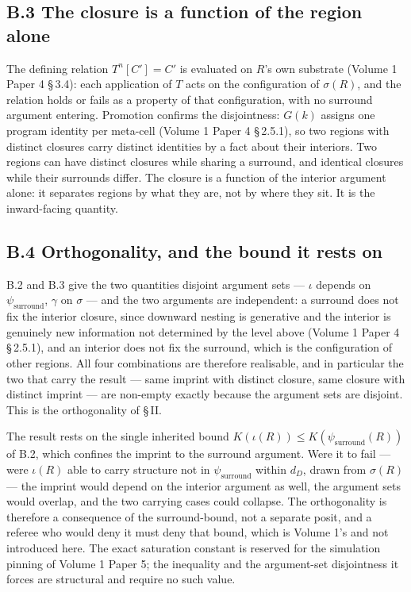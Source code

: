 \documentclass[11pt,oneside]{report}
\theoremstyle{definition}
\theoremstyle{remark}
\begin{document}
\subsection*{B.3 The closure is a function of the region alone}

The defining relation \ensuremath{T^{n}[C'] = C'} is evaluated on
\ensuremath{R}'s own substrate (Volume 1 Paper 4 \S\,3.4): each application of
\ensuremath{T} acts on the configuration of \ensuremath{\sigma(R)}, and the
relation holds or fails as a property of that configuration, with no surround
argument entering. Promotion confirms the disjointness: \ensuremath{G(k)}
assigns one program identity per meta-cell (Volume 1 Paper 4 \S\,2.5.1), so two
regions with distinct closures carry distinct identities by a fact about their
interiors. Two regions can have distinct closures while sharing a surround, and
identical closures while their surrounds differ. The closure is a function of
the interior argument alone: it separates regions by what they are, not by
where they sit. It is the inward-facing quantity.

\subsection*{B.4 Orthogonality, and the bound it rests on}

B.2 and B.3 give the two quantities disjoint argument sets ---
\ensuremath{\iota} depends on \ensuremath{\psi_{\mathrm{surround}}},
\ensuremath{\gamma} on \ensuremath{\sigma} --- and the two arguments are
independent: a surround does not fix the interior closure, since downward
nesting is generative and the interior is genuinely new information not
determined by the level above (Volume 1 Paper 4 \S\,2.5.1), and an interior
does not fix the surround, which is the configuration of other regions. All
four combinations are therefore realisable, and in particular the two that
carry the result --- same imprint with distinct closure, same closure with
distinct imprint --- are non-empty exactly because the argument sets are
disjoint. This is the orthogonality of \S\,II.

The result rests on the single inherited bound
\ensuremath{K(\iota(R)) \le K(\psi_{\mathrm{surround}}(R))} of B.2, which
confines the imprint to the surround argument. Were it to fail --- were
\ensuremath{\iota(R)} able to carry structure not in
\ensuremath{\psi_{\mathrm{surround}}} within \ensuremath{d_D}, drawn from
\ensuremath{\sigma(R)} --- the imprint would depend on the interior argument as
well, the argument sets would overlap, and the two carrying cases could
collapse. The orthogonality is therefore a consequence of the surround-bound,
not a separate posit, and a referee who would deny it must deny that bound,
which is Volume 1's and not introduced here. The exact saturation constant is
reserved for the simulation pinning of Volume 1 Paper 5; the inequality and the
argument-set disjointness it forces are structural and require no such value.
\end{document}
